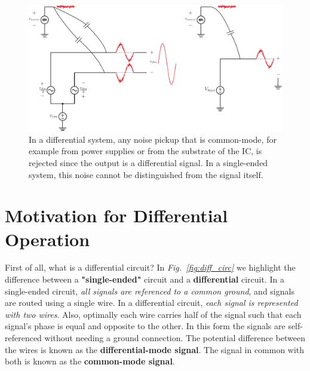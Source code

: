 \begin{figure}[H]
\centering
\includegraphics[scale=0.85]{diff_cm_noise} 
\caption{In a differential system, any noise pickup that is common-mode, for example from power supplies or from the substrate of the IC, is rejected since the output is a differential signal.  In a single-ended system, this noise cannot be distinguished from the signal itself.}
\label{fig:noise_reject}
\end{figure}
\section{Motivation for Differential Operation}
First of all, what is a differential circuit?  In \emph{Fig.~\ref{fig:diff_circ}} we highlight the difference between a \textbf{"single-ended"} circuit and a \textbf{differential} circuit. In a single-ended circuit, \textit{all signals are referenced to a common ground}, and signals are routed using a single wire.  In a differential circuit, \textit{each signal is represented with two wires}.  Also, optimally each wire carries half of the signal such that each signal's phase is equal and opposite to the other.  In this form the signals are self-referenced without needing a ground connection.  The potential difference between the wires is known as the \textbf{differential-mode signal}.  The signal in common with both is known as the \textbf{common-mode signal}.


